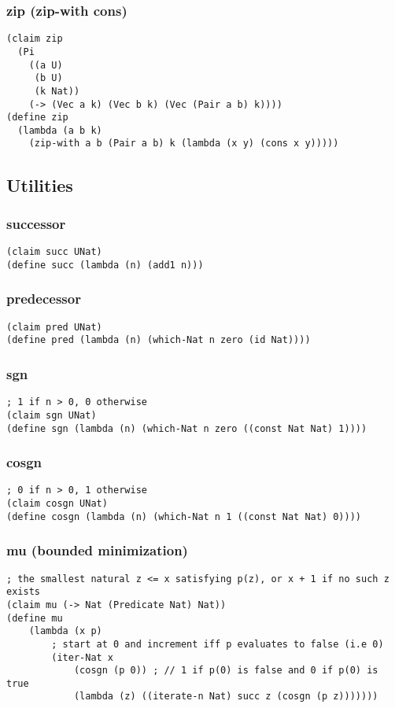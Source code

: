 \subsubsection{zip (zip-with cons)} \label{code:zip}
\begin{lstlisting}
(claim zip
  (Pi
    ((a U)
     (b U)
     (k Nat))
    (-> (Vec a k) (Vec b k) (Vec (Pair a b) k))))
(define zip
  (lambda (a b k)
    (zip-with a b (Pair a b) k (lambda (x y) (cons x y)))))
\end{lstlisting}


\subsection{Utilities}

\subsubsection{successor} \label{code:successor}
\begin{lstlisting}
(claim succ UNat)
(define succ (lambda (n) (add1 n)))
\end{lstlisting}

\subsubsection{predecessor} \label{code:predecessor}
\begin{lstlisting}
(claim pred UNat)
(define pred (lambda (n) (which-Nat n zero (id Nat))))
\end{lstlisting}

\subsubsection{sgn} \label{code:sgn}
\begin{lstlisting}
; 1 if n > 0, 0 otherwise
(claim sgn UNat)
(define sgn (lambda (n) (which-Nat n zero ((const Nat Nat) 1))))
\end{lstlisting}

\subsubsection{cosgn} \label{code:cosgn}
\begin{lstlisting}
; 0 if n > 0, 1 otherwise
(claim cosgn UNat)
(define cosgn (lambda (n) (which-Nat n 1 ((const Nat Nat) 0))))
\end{lstlisting}

\subsubsection{mu (bounded minimization)} \label{code:mu}
\begin{lstlisting}
; the smallest natural z <= x satisfying p(z), or x + 1 if no such z exists
(claim mu (-> Nat (Predicate Nat) Nat))
(define mu
    (lambda (x p)
        ; start at 0 and increment iff p evaluates to false (i.e 0)
        (iter-Nat x 
            (cosgn (p 0)) ; // 1 if p(0) is false and 0 if p(0) is true
            (lambda (z) ((iterate-n Nat) succ z (cosgn (p z)))))))
\end{lstlisting}


